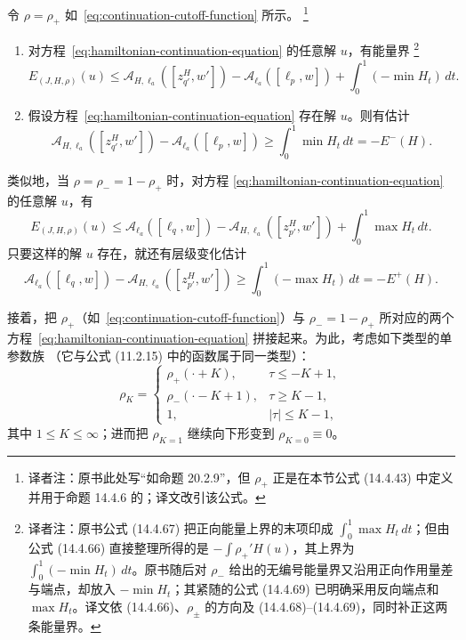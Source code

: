 \begin{corollary}
\label{cor:continuation-energy-and-level-bounds}
令 $\rho=\rho_+$ 如~\eqref{eq:continuation-cutoff-function} 所示。
\footnote{译者注：原书此处写“如命题 20.2.9”，但 $\rho_+$ 正是在本节公式
(14.4.43) 中定义并用于命题 14.4.6 的；译文改引该公式。}
\begin{enumerate}[label=(\arabic*)]
  \item 对方程~\eqref{eq:hamiltonian-continuation-equation} 的任意解 $u$，有能量界
  \footnote{译者注：原书公式 (14.4.67) 把正向能量上界的末项印成
  $\int_0^1\max H_t\,dt$；但由公式 (14.4.66) 直接整理所得的是
  $-\int\rho_+'H(u)$，其上界为 $\int_0^1(-\min H_t)\,dt$。原书随后对
  $\rho_-$ 给出的无编号能量界又沿用正向作用量差与端点，却放入
  $-\min H_t$；其紧随的公式 (14.4.69) 已明确采用反向端点和
  $\max H_t$。译文依 (14.4.66)、$\rho_\pm$ 的方向及
  (14.4.68)--(14.4.69)，同时补正这两条能量界。}
  \begin{equation}
    E_{(J,H,\rho)}(u)
    \leq
    \mathcal A_{H,\ell_a}([z_{q'}^H,w'])
    -
    \mathcal A_{\ell_a}([\ell_p,w])
    +
    \int_0^1(-\min H_t)\,dt.
  \label{eq:forward-continuation-energy-bound}
  \end{equation}

  \item 假设方程~\eqref{eq:hamiltonian-continuation-equation} 存在解 $u$。则有\termLevelChange{}估计
  \begin{equation}
    \mathcal A_{H,\ell_a}([z_{q'}^H,w'])
    -
    \mathcal A_{\ell_a}([\ell_p,w])
    \geq
    \int_0^1\min H_t\,dt
    =
    -E^-(H).
  \label{eq:forward-continuation-level-change}
  \end{equation}
\end{enumerate}

类似地，当 $\rho=\rho_-=1-\rho_+$ 时，对方程
\eqref{eq:hamiltonian-continuation-equation} 的任意解 $u$，有
\[
  E_{(J,H,\rho)}(u)
  \leq
  \mathcal A_{\ell_a}([\ell_q,w])
  -
  \mathcal A_{H,\ell_a}([z_{p'}^H,w'])
  +
  \int_0^1\max H_t\,dt.
\]
只要这样的解 $u$ 存在，就还有层级变化估计
\begin{equation}
  \mathcal A_{\ell_a}([\ell_q,w])
  -
  \mathcal A_{H,\ell_a}([z_{p'}^H,w'])
  \geq
  \int_0^1(-\max H_t)\,dt
  =
  -E^+(H).
\label{eq:reverse-continuation-level-change}
\end{equation}
\end{corollary}

接着，把 $\rho_+$（如~\eqref{eq:continuation-cutoff-function}）与
$\rho_-=1-\rho_+$ 所对应的两个方程~\eqref{eq:hamiltonian-continuation-equation}
拼接起来。为此，考虑如下类型的单参数\termElongationFunction{}族
（它与公式 (11.2.15) 中的函数属于同一类型）：
\begin{equation}
  \rho_K
  =
  \begin{cases}
    \rho_+(\mathord\cdot+K),
      &\tau\leq-K+1,\\
    \rho_-(\mathord\cdot-K+1),
      &\tau\geq K-1,\\
    1,
      &|\tau|\leq K-1,
  \end{cases}
\label{eq:concatenated-elongation-family}
\end{equation}
其中 $1\leq K\leq\infty$；进而把 $\rho_{K=1}$ 继续向下形变到
$\rho_{K=0}\equiv0$。

